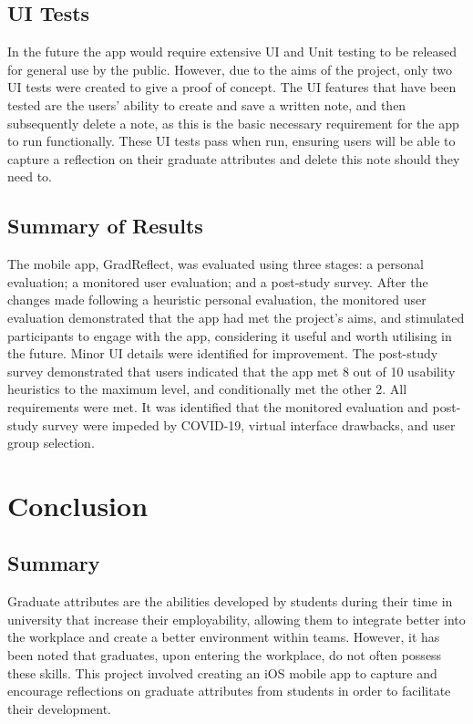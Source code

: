 \documentclass{l4proj}
\begin{document}
\section{UI Tests}

In the future the app would require extensive UI and Unit testing to be released for general use by the public. However, due to the aims of the project, only two UI tests were created to give a proof of concept. The UI features that have been tested are the users' ability to create and save a written note, and then subsequently delete a note, as this is the basic necessary requirement for the app to run functionally. These UI tests pass when run, ensuring users will be able to capture a reflection on their graduate attributes and delete this note should they need to.

\section{Summary of Results}

The mobile app, GradReflect, was evaluated using three stages: a personal evaluation; a monitored user evaluation; and a post-study survey. After the changes made following a heuristic personal evaluation, the monitored user evaluation demonstrated that the app had met the project’s aims, and stimulated participants to engage with the app, considering it useful and worth utilising in the future. Minor UI details were identified for improvement. The post-study survey demonstrated that users indicated that the app met 8 out of 10 usability heuristics to the maximum level, and conditionally met the other 2. All requirements were met. It was identified that the monitored evaluation and post-study survey were impeded by COVID-19, virtual interface drawbacks, and user group selection.


\chapter{Conclusion}  

\section{Summary}

Graduate attributes are the abilities developed by students during their time in university that increase their employability, allowing them to integrate better into the workplace and create a better environment within teams. However, it has been noted that graduates, upon entering the workplace, do not often possess these skills. This project involved creating an iOS mobile app to capture and encourage reflections on graduate attributes from students in order to facilitate their development.
\end{document}
